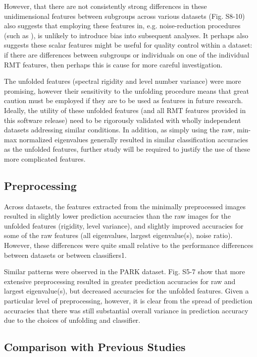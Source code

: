 However, that there are not consistently strong differences in these unidimensional features between
subgroups across various datasets (Fig. S8-10) also suggests that employing these features in, e.g.
noise-reduction procedures (such as
\cite{veraartDiffusionMRINoise2016,veraartDenoisingDiffusionMRI2016}), is unlikely to introduce bias
into subsequent analyses. It perhaps also suggests these scalar features might be useful for quality
control within a dataset: if there are differences between subgroups or individuals on one of the
individual RMT features, then perhaps this is cause for more careful investigation.

The unfolded features (spectral rigidity and level number variance) were more promising, however
their sensitivity to the unfolding procedure means that great caution must be employed if they are
to be used as features in future research. Ideally, the utility of these unfolded features (and all
RMT features provided in this software release) need to be rigorously validated with wholly
independent datasets addressing similar conditions. In addition, as simply using the raw, min-max
normalized eigenvalues generally resulted in similar classification accuracies as the unfolded
features, further study will be required to justify the use of these more complicated features.

\subsection{Preprocessing}
Across datasets, the features extracted from the minimally preprocessed images resulted in slightly
lower prediction accuracies than the raw images for the unfolded features (rigidity, level
variance), and slightly improved accuracies for some of the raw features (all eigenvalues, largest
eigenvalue(s), noise ratio). However, these differences were quite small relative to the performance
differences between datasets or between classifiers1.

Similar patterns were observed in the PARK dataset. Fig. S5-7 show that more extensive preprocessing
resulted in greater prediction accuracies for raw and largest eigenvalue(s), but decreased
accuracies for the unfolded features. Given a particular level of preprocessing, however, it is
clear from the spread of prediction accuracies that there was still substantial overall variance in
prediction accuracy due to the choices of unfolding and classifier.

\subsection{Comparison with Previous Studies}

